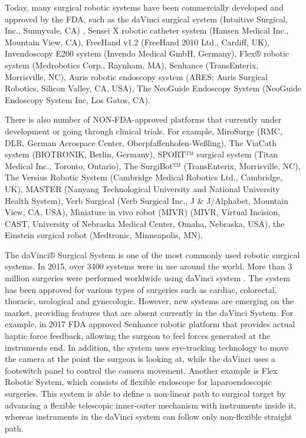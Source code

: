 Today, many surgical robotic systems have been commercially developed and approved by the FDA, such as the daVinci surgical system (Intuitive Surgical, Inc., Sunnyvale, CA) , Sensei X robotic catheter system (Hansen Medical Inc., Mountain View, CA), FreeHand v1.2 (FreeHand 2010 Ltd., Cardiff, UK), Invendoscopy E200 system (Invendo Medical GmbH, Germany), Flex® robotic system (Medrobotics Corp., Raynham, MA), Senhance (TransEnterix, Morrisville, NC), Auris robotic endoscopy system (ARES; Auris Surgical Robotics, Silicon Valley, CA, USA), The NeoGuide Endoscopy System (NeoGuide Endoscopy System Inc, Los Gatos, CA). \cite{lanfranco_robotic_2004,peters_review_2018} 

There is also number of NON-FDA-approved platforms that currently under development or going through clinical trials. For example, MiroSurge (RMC, DLR, German Aerospace Center, Oberpfaffenhofen-Weßling), The ViaCath system (BIOTRONIK, Berlin, Germany), SPORT™ surgical system (Titan Medical Inc., Toronto, Ontario), The SurgiBot™ (TransEnterix, Morrisville, NC), The Versius Robotic System (Cambridge Medical Robotics Ltd., Cambridge, UK), MASTER (Nanyang Technological University and National University Health System), Verb Surgical (Verb Surgical Inc., J \& J/Alphabet, Mountain View, CA, USA), Miniature in vivo robot (MIVR) (MIVR, Virtual Incision, CAST, University of Nebraska Medical Center, Omaha, Nebraska, USA), the Einstein surgical robot (Medtronic, Minneapolis, MN). \cite{peters_review_2018}

The daVinci® Surgical System is one of the most commonly used robotic surgical systems. In 2015, over 3400 systems were in use around the world. More than 3 million surgeries were performed worldwide using daVinci system \cite{_intuitive_2018}. The system has been approved for various types of surgeries such as cardiac, colorectal, thoracic, urological and gynecologic. However, new systems are emerging on the market, providing features that are absent currently in the daVinci System. For example, in 2017 FDA approved Senhance robotic platform that provides actual haptic force feedback, allowing the surgeon to feel forces generated at the instruments end. In addition, the system uses eye-tracking technology to move the camera at the point the surgeon is looking at, while the daVinci uses a footswitch panel to control the camera movement. Another example is Flex Robotic System, which consists of flexible endoscope for laparoendoscopic surgeries. This system is able to define a non-linear path to surgical target by advancing a flexible telescopic inner-outer mechanism with instruments inside it, whereas instruments in the daVinci system can follow only non-flexible straight path. \cite{peters_review_2018}

